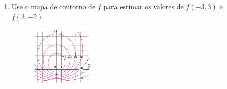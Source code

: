 \documentclass[a4paper,5pt]{amsbook}
\begin{document}
\begin{enumerate}
    \item Use o mapa de contorno de $f$ para estimar os valores de $f(-3,3)$ e $f(3,-2)$.
        \begin{figure}[h]
            \centering
            \includegraphics[width=0.3\textwidth]{lista-01-fig2.png}
        \end{figure}
\end{enumerate}
\end{document}

